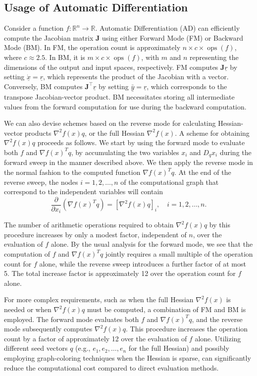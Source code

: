 \subsection*{Usage of Automatic Differentiation}

Consider a function \( f: \mathbb{R}^n \to \mathbb{R} \). Automatic Differentiation (AD) can efficiently compute the Jacobian matrix \( \mathbf{J} \) using either Forward Mode (FM) or Backward Mode (BM). In FM, the operation count is approximately \( n \times c \times \operatorname{ops}(f) \), where \( c \approx 2.5 \). In BM, it is \( m \times c \times \operatorname{ops}(f) \), with \( m \) and \( n \) representing the dimensions of the output and input spaces, respectively. FM computes \( \mathbf{J}\underline{r} \) by setting \( \underline{\dot{x}} = \underline{r} \), which represents the product of the Jacobian with a vector. Conversely, BM computes \( \mathbf{J}^\top \underline{r} \) by setting \( \bar{\underline{y}} = \underline{r} \), which corresponds to the transpose Jacobian-vector product. BM necessitates storing all intermediate values from the forward computation for use during the backward computation.

We can also devise schemes based on the reverse mode for calculating Hessian-vector products \( \nabla^2 f(x)q \), or the full Hessian \( \nabla^2 f(x) \). A scheme for obtaining \( \nabla^2 f(x)q \) proceeds as follows. We start by using the forward mode to evaluate both \( f \) and \( \nabla f(x)^T q \), by accumulating the two variables \( x_i \) and \( D_q x_i \) during the forward sweep in the manner described above. We then apply the reverse mode in the normal fashion to the computed function \( \nabla f(x)^T q \). At the end of the reverse sweep, the nodes \( i = 1, 2, \ldots, n \) of the computational graph that correspond to the independent variables will contain
\[
\frac{\partial}{\partial x_i} (\nabla f(x)^T q) = [\nabla^2 f(x)q]_i, \quad i = 1, 2, \ldots, n.
\]


The number of arithmetic operations required to obtain \( \nabla^2 f(x)q \) by this procedure increases by only a modest factor, independent of \( n \), over the evaluation of \( f \) alone. By the usual analysis for the forward mode, we see that the computation of \( f \) and \( \nabla f(x)^T q \) jointly requires a small multiple of the operation count for \( f \) alone, while the reverse sweep introduces a further factor of at most 5. The total increase factor is approximately 12 over the operation count for \( f \) alone.

For more complex requirements, such as when the full Hessian \( \nabla^2 f(x) \) is needed or when \( \nabla^2 f(x) q \) must be computed, a combination of FM and BM is employed. The forward mode evaluates both \( f \) and \( \nabla f(x)^T q \), and the reverse mode subsequently computes \( \nabla^2 f(x) q \). This procedure increases the operation count by a factor of approximately 12 over the evaluation of \( f \) alone. Utilizing different seed vectors \( q \) (e.g., \( e_1, e_2, \ldots, e_n \) for the full Hessian) and possibly employing graph-coloring techniques when the Hessian is sparse, can significantly reduce the computational cost compared to direct evaluation methods.